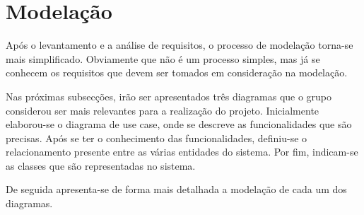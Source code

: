 \chapter[Modelação]
{Modela\c{c}\~ao}

Após o levantamento e a análise de requisitos, o processo de modelação torna-se mais simplificado. Obviamente que não é um processo simples, mas já se conhecem os requisitos que devem ser tomados em consideração na modelação.

Nas próximas subsecções, irão ser apresentados três diagramas que o grupo considerou ser mais relevantes para a realização do projeto. Inicialmente elaborou-se o diagrama de use case, onde se descreve as funcionalidades que são precisas. Após se ter o conhecimento das funcionalidades, definiu-se o relacionamento presente entre as várias entidades do sistema. Por fim, indicam-se as classes que são representadas no sistema.

De seguida apresenta-se de forma mais detalhada a modelação de cada um dos diagramas.




